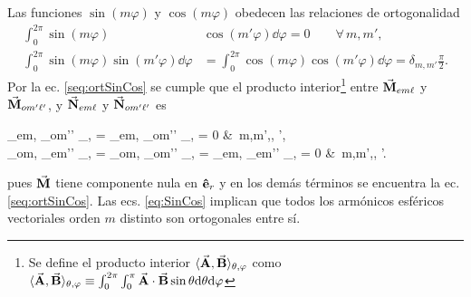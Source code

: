  Las funciones $\sin(m\varphi)$ y $\cos(m\varphi)$ obedecen las relaciones de ortogonalidad
 	\begin{subequations}
	\begin{align}
	\int_0^{2\pi} \sin(m\varphi) &\cos(m' \varphi) \dd\varphi = 0 \qquad \forall\, m,m',\label{seq:ortSinCos}\\
	\int_0^{2\pi} \sin(m\varphi) \sin(m'\varphi)\dd\varphi &=  \int_0^{2\pi} \cos(m\varphi) \cos(m'\varphi)\dd\varphi  = \delta_{m,m'}\frac{\pi}{2}.\label{seq:ortCos2}
	\end{align}\label{eq:SinCos}
 	\end{subequations}
Por la ec. \eqref{seq:ortSinCos} se cumple que el producto interior\footnote{Se define el producto interior $\langle \va{A},\va{B} \rangle_{\theta,\varphi}$ como $\langle \va{A},\va{B} \rangle_{\theta,\varphi} \equiv \int_0^{2\pi}\int_0^\pi \va{A}\cdot\va{B} \sin\theta \dd\theta \dd\varphi$} entre $\va{M}_{em\ell}$ y $\va{M}_{om'\ell'}$, y $\va{N}_{em\ell}$ y $\va{N}_{om'\ell'}$ es
	\begin{tcolorbox}
		\langle{}_{em\ell}, _{om'\ell'} \rangle_{\theta,\varphi} =
		\langle{}_{em\ell}, _{om'\ell'} \rangle_{\theta,\varphi} = 0
		&\qquad \forall\,  m,m',\ell, \ell',\\
		\intertext{así como también}
		\langle{}_{om\ell}, _{em'\ell'} \rangle_{\theta,\varphi} = 
		\langle{}_{om\ell}, _{om'\ell'} \rangle_{\theta,\varphi} = 	
		\langle{}_{em\ell}, _{em'\ell'} \rangle_{\theta,\varphi} = 	0
		&\qquad \forall\,  m,m',\ell, \ell'.				
	\end{tcolorbox}\noindent
pues $\va{M}$ tiene componente nula en $\vu{e}_r$ y en los demás términos se encuentra la ec. \eqref{seq:ortSinCos}. Las ecs. \eqref{eq:SinCos} implican que todos los armónicos esféricos vectoriales orden $m$ distinto  son ortogonales entre sí.\\

